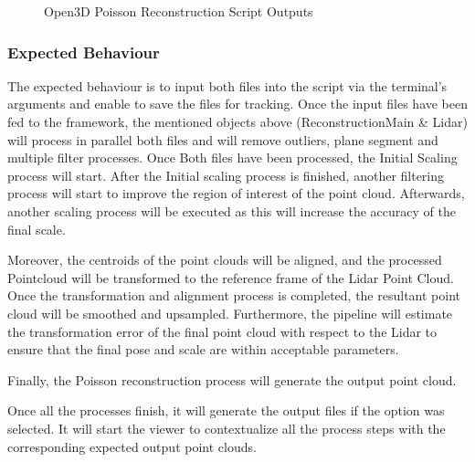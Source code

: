 \documentclass[12pt]{report}
\begin{document}
\begin{figure}[H]
  \qquad
\caption{Open3D Poisson Reconstruction Script Outputs}
\label{fig:open3dpossionscreipt} 
\end{figure}

 
\subsubsection{Expected Behaviour}
The expected behaviour is to input both files into the script via the terminal's arguments and enable to save the files for tracking. 
Once the input files have been fed to the framework, the mentioned objects above (ReconstructionMain \& Lidar) will process in parallel both files and will remove outliers, plane segment and multiple filter processes.
Once Both files have been processed, the Initial Scaling process will start. After the Initial scaling process is finished, another filtering process will start to improve the region of interest of the point cloud.
Afterwards, another scaling process will be executed as this will increase the accuracy of the final scale. 

Moreover, the centroids of the point clouds will be aligned, and the processed Pointcloud will be transformed to the reference frame of the Lidar Point Cloud.
Once the transformation and alignment process is completed, the resultant point cloud will be smoothed and upsampled.
Furthermore, the pipeline will estimate the transformation error of the final point cloud with respect to the Lidar to ensure that the final pose and scale are within acceptable parameters. 

Finally, the Poisson reconstruction process will generate the output point cloud. 

Once all the processes finish, it will generate the output files if the option was selected. It will start the viewer to contextualize all the process steps with the corresponding expected output point clouds.
\end{document}
